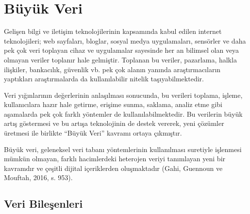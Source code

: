 \documentclass[12pt,twoside]{deuthesis}
\begin{document}
\hypertarget{buxfcyuxfck-veri}{%
\chapter{Büyük Veri}\label{buxfcyuxfck-veri}}

Gelişen bilgi ve iletişim teknolojilerinin kapsamında kabul edilen internet teknolojileri; web sayfaları, bloglar, sosyal medya uygulamaları, sensörler ve daha pek çok veri toplayan cihaz ve uygulamalar sayesinde her an bilimsel olan veya olmayan veriler toplanır hale gelmiştir. Toplanan bu veriler, pazarlama, halkla ilişkiler, bankacılık, güvenlik vb. pek çok alanın yanında araştırmacıların yaptıkları araştırmalarda da kullanılabilir nitelik taşıyabilmektedir.

Veri yığınlarının değerlerinin anlaşılması sonucunda, bu verileri toplama, işleme, kullanıcılara hazır hale getirme, erişime sunma, saklama, analiz etme gibi aşamalarda pek çok farklı yöntemler de kullanılabilmektedir. Bu verilerin büyük artış göstermesi ve bu artışa teknolojinin de destek vererek, yeni çözümler üretmesi ile birlikte ``Büyük Veri'' kavramı ortaya çıkmıştır.

Büyük veri, geleneksel veri tabanı yöntemlerinin kullanılması suretiyle işlenmesi mümkün olmayan, farklı hacimlerdeki heterojen veriyi tanımlayan yeni bir kavramdır ve çeşitli dijital içeriklerden oluşmaktadır (Gahi, Guennoun ve Mouftah, 2016, s. 953).

\hypertarget{veri-bileux15fenleri}{%
\section{Veri Bileşenleri}\label{veri-bileux15fenleri}}
\end{document}
